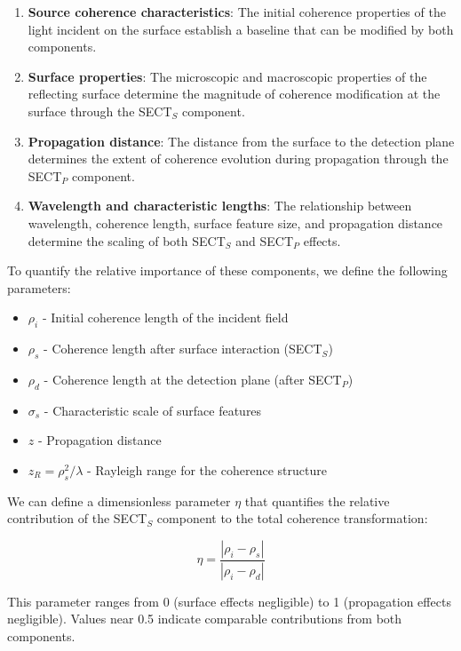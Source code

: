 \documentclass[a4paper,12pt]{article}
\begin{document}
\begin{enumerate}
\item \textbf{Source coherence characteristics}: The initial coherence properties of the light incident on the surface establish a baseline that can be modified by both components.

\item \textbf{Surface properties}: The microscopic and macroscopic properties of the reflecting surface determine the magnitude of coherence modification at the surface through the SECT$_S$ component.

\item \textbf{Propagation distance}: The distance from the surface to the detection plane determines the extent of coherence evolution during propagation through the SECT$_P$ component.

\item \textbf{Wavelength and characteristic lengths}: The relationship between wavelength, coherence length, surface feature size, and propagation distance determine the scaling of both SECT$_S$ and SECT$_P$ effects.
\end{enumerate}

To quantify the relative importance of these components, we define the following parameters:
\begin{itemize}
\item $\rho_i$ - Initial coherence length of the incident field
\item $\rho_s$ - Coherence length after surface interaction (SECT$_S$)
\item $\rho_d$ - Coherence length at the detection plane (after SECT$_P$)
\item $\sigma_s$ - Characteristic scale of surface features
\item $z$ - Propagation distance
\item $z_R = \rho_s^2/\lambda$ - Rayleigh range for the coherence structure
\end{itemize}

We can define a dimensionless parameter $\eta$ that quantifies the relative contribution of the SECT$_S$ component to the total coherence transformation:

\begin{equation}
\eta = \frac{|\rho_i - \rho_s|}{|\rho_i - \rho_d|}
\end{equation}

This parameter ranges from 0 (surface effects negligible) to 1 (propagation effects negligible). Values near 0.5 indicate comparable contributions from both components.
\end{document}
